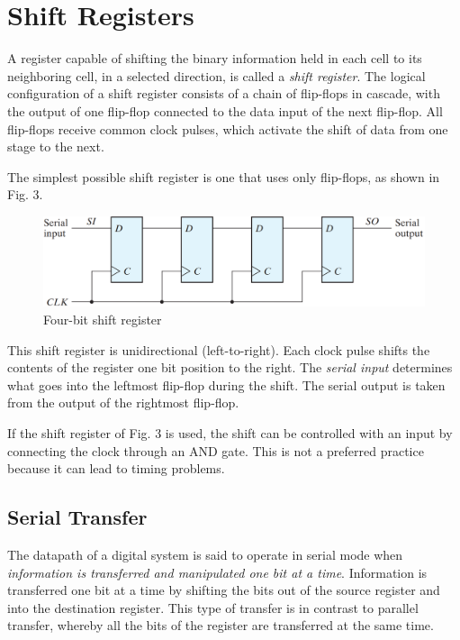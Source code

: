 \section{Shift Registers}
\label{sec:shift-registers}

A register capable of shifting the binary information held in each cell to its neighboring cell, in a selected direction, is called a \textit{shift register}. The logical configuration of a shift register consists of a chain of flip-flops in cascade, with the output of one flip-flop connected to the data input of the next flip-flop. All flip-flops receive common clock pulses, which activate the shift of data from one stage to the next.

The simplest possible shift register is one that uses only flip-flops, as shown in Fig. 3.
\begin{figure}[H]
  \centering
  \includegraphics[width=\linewidth]{img/fig-6.3.png}
  \caption{Four-bit shift register}
  \label{fig:6.3}
\end{figure}
\noindent This shift register is unidirectional (left-to-right). Each clock pulse shifts the contents of the register one bit position to the right. The \textit{serial input} determines what goes into the leftmost flip-flop during the shift. The serial output is taken from the output of the rightmost flip-flop.

If the shift register of Fig. 3 is used, the shift can be controlled with an input by connecting the clock through an AND gate. This is not a preferred practice because it can lead to timing problems.


\subsection{Serial Transfer}
\label{subsec:serial-transfer}

The datapath of a digital system is said to operate in serial mode when \textit{information is transferred and manipulated one bit at a time}. Information is transferred one bit at a time by shifting the bits out of the source register and into the destination register. This type of transfer is in contrast to parallel transfer, whereby all the bits of the register are transferred at the same time.

